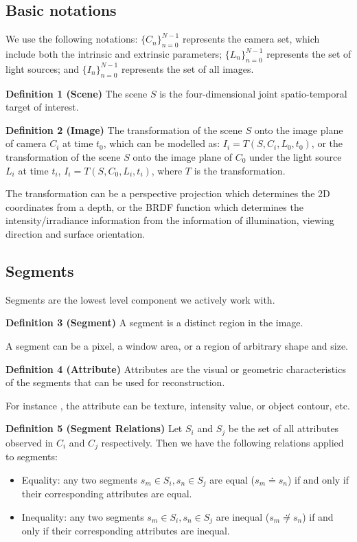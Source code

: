 \subsection{Basic notations}
We use the following notations: $\{C_n\}_{n=0}^{N-1}$ represents the camera set, which include both the intrinsic and extrinsic parameters; $\{L_n\}_{n=0}^{N-1}$ represents the set of light sources; and $\{I_n\}_{n=0}^{N-1}$ represents the set of all images.

\textbf{Definition 1 (Scene)} The scene $S$ is the four-dimensional joint spatio-temporal target of interest.

\textbf{Definition 2 (Image)} The transformation of the scene $S$ onto the image plane of camera $C_i$ at time $t_0$, which can be modelled as: $I_i = T(S, C_i, L_0, t_0)$, or the transformation of the scene $S$ onto the image plane of $C_0$  under the light source $L_i$ at time $t_i$, $I_i= T(S, C_0, L_i, t_i)$, where $T$ is the transformation.

The transformation can be a perspective projection which determines the 2D coordinates from a depth, or the BRDF function which determines the intensity/irradiance information from the information of illumination, viewing direction and surface orientation.

\subsection{Segments}
Segments are the lowest level component we actively work with.

\textbf{Definition 3 (Segment)} A segment is a distinct region in the image.

A segment can be a pixel, a window area, or a region of arbitrary shape and size.

\textbf{Definition 4 (Attribute)} Attributes are the visual or geometric characteristics of the segments that can be used for reconstruction.

For instance , the attribute can be texture, intensity value, or object contour, etc.


\textbf{Definition 5 (Segment Relations)} Let $S_i$ and $S_j$ be the set of all attributes observed in $C_i$ and $C_j$ respectively. Then we have the following relations applied to segments:
\begin{itemize}
\item Equality: any two segments $s_m \in S_i, s_n \in S_j$ are equal ($s_m \doteq s_n$) if and only if their corresponding attributes are equal.
\item Inequality: any two segments $s_m \in S_i, s_n \in S_j$ are inequal ($s_m \not \doteq s_n$) if and only if their corresponding attributes are inequal.
\end{itemize}

